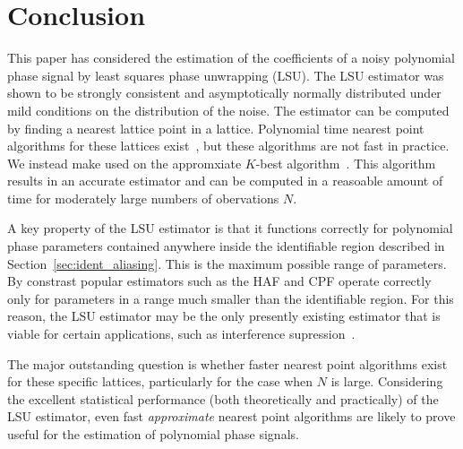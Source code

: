 \documentclass[journal]{IEEEtran}
\begin{document}



 
\section{Conclusion} \label{sec:conclusion}
 
This paper has considered the estimation of the coefficients of a noisy polynomial phase signal by least squares phase unwrapping (LSU). The LSU estimator was shown to be strongly consistent and asymptotically normally distributed under mild conditions on the distribution of the noise.  The estimator can be computed by finding a nearest lattice point in a lattice. Polynomial time nearest point algorithms for these lattices exist~\cite[Sec 4.3]{McKilliam2010thesis}, but these algorithms are not fast in practice.  We instead make used on the appromxiate $K$-best algorithm~\cite{Baro_list_sphere_dec_2003,Zhan2006_K_best_sphere_decoder,Mondal_Kbest_again_2009}.  This algorithm results in an accurate estimator and can be computed in a reasoable amount of time for moderately large numbers of obervations $N$. 

A key property of the LSU estimator is that it functions correctly for polynomial phase parameters contained anywhere inside the identifiable region described in Section~\ref{sec:ident_aliasing}.  This is the maximum possible range of parameters.  By constrast popular estimators such as the HAF and CPF operate correctly only for parameters in a range much smaller than the identifiable region.  For this reason, the LSU estimator may be the only presently existing estimator that is viable for certain applications, such as interference supression~\cite{Djukanovic:2011:PMN:1950994.1951252,Djurovic_aliasing_2012}. 

The major outstanding question is whether faster nearest point algorithms exist for these specific lattices, particularly for the case when $N$ is large.  Considering the excellent statistical performance (both theoretically and practically) of the LSU estimator, even fast \emph{approximate} nearest point algorithms are likely to prove useful for the estimation of polynomial phase signals. 

\nocite{OShea_refiningpps_2010}
 
\small 
 


\normalsize
\end{document}
